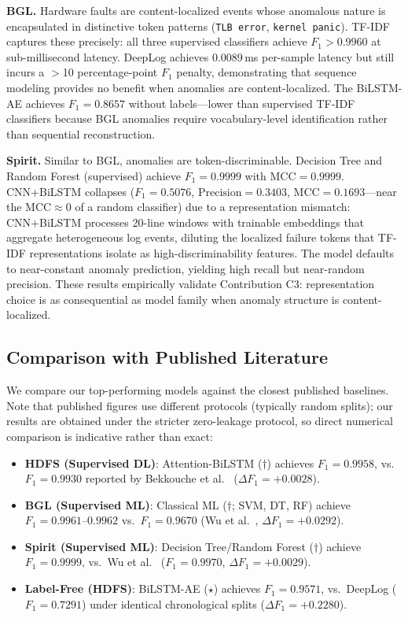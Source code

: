 \documentclass{elektr}
\begin{document}
\textbf{BGL.} Hardware faults are content-localized events whose anomalous nature
is encapsulated in distinctive token patterns (\texttt{TLB error},
\texttt{kernel panic}). TF-IDF captures these precisely: all three supervised
classifiers achieve $F_1{>}0.9960$ at sub-millisecond latency. DeepLog achieves
0.0089\,ms per-sample latency but still incurs a $>$10 percentage-point $F_1$ penalty, demonstrating that sequence
modeling provides no benefit when anomalies are content-localized. The BiLSTM-AE
achieves $F_1{=}0.8657$ without labels---lower than supervised TF-IDF classifiers
because BGL anomalies require vocabulary-level identification rather than
sequential reconstruction.

\textbf{Spirit.} Similar to BGL, anomalies are token-discriminable. Decision Tree
and Random Forest (supervised) achieve $F_1{=}0.9999$ with $\text{MCC}{=}0.9999$.
CNN+BiLSTM collapses ($F_1{=}0.5076$, $\text{Precision}{=}0.3403$,
$\text{MCC}{=}0.1693$---near the $\text{MCC}\approx 0$ of a random classifier)
due to a representation mismatch: CNN+BiLSTM processes 20-line windows with
trainable embeddings that aggregate heterogeneous log events, diluting the
localized failure tokens that TF-IDF representations isolate as high-discriminability
features. The model defaults to near-constant anomaly prediction, yielding
high recall but near-random precision. These results empirically validate
Contribution C3: representation choice is as consequential as model family when
anomaly structure is content-localized.

\subsection{Comparison with Published Literature}

We compare our top-performing models against the closest published baselines.
Note that published figures use different protocols (typically random splits);
our results are obtained under the stricter zero-leakage protocol, so
direct numerical comparison is indicative rather than exact:
\begin{itemize}
    \item \textbf{HDFS (Supervised DL)}: Attention-BiLSTM ($\dagger$) achieves $F_1{=}0.9958$,
    vs.\ $F_1{=}0.9930$ reported by Bekkouche et al.~\cite{ref2} ($\Delta F_1{=}+0.0028$).
    \item \textbf{BGL (Supervised ML)}: Classical ML ($\dagger$; SVM, DT, RF) achieve
    $F_1{=}0.9961$--$0.9962$ vs.\ $F_1{=}0.9670$ (Wu et al.~\cite{ref8}, $\Delta F_1{=}+0.0292$).
    \item \textbf{Spirit (Supervised ML)}: Decision Tree/Random Forest ($\dagger$) achieve
    $F_1{=}0.9999$, vs.\ Wu et al.~\cite{ref8} ($F_1{=}0.9970$, $\Delta F_1{=}+0.0029$).
    \item \textbf{Label-Free (HDFS)}: BiLSTM-AE ($\star$) achieves $F_1{=}0.9571$,
    vs.\ DeepLog ($F_1{=}0.7291$) under identical chronological splits ($\Delta F_1{=}+0.2280$).
\end{itemize}
\end{document}
